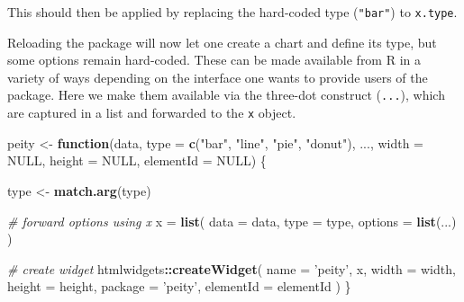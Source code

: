 \documentclass[10pt,]{krantz}
\makeatletter
\newenvironment{Shaded}{\begin{snugshade}}{\end{snugshade}}
\newcommand{\AttributeTok}[1]{\textcolor[rgb]{0.61,0.61,0.61}{#1}}
\newcommand{\CommentTok}[1]{\textcolor[rgb]{0.37,0.37,0.37}{\textit{#1}}}
\newcommand{\ControlFlowTok}[1]{\textcolor[rgb]{0.27,0.27,0.27}{\textbf{#1}}}
\newcommand{\DataTypeTok}[1]{\textcolor[rgb]{0.27,0.27,0.27}{#1}}
\newcommand{\KeywordTok}[1]{\textcolor[rgb]{0.27,0.27,0.27}{\textbf{#1}}}
\newcommand{\NormalTok}[1]{#1}
\newcommand{\OperatorTok}[1]{\textcolor[rgb]{0.43,0.43,0.43}{\textbf{#1}}}
\newcommand{\OtherTok}[1]{\textcolor[rgb]{0.37,0.37,0.37}{#1}}
\newcommand{\StringTok}[1]{\textcolor[rgb]{0.5,0.5,0.5}{#1}}
\newcommand{\VariableTok}[1]{\textcolor[rgb]{0,0,0}{#1}}
\newenvironment{kframe}{%
\medskip{}
\setlength{\fboxsep}{.8em}
 \def\at@end@of@kframe{}%
 \ifinner\ifhmode%
  \def\at@end@of@kframe{\end{minipage}}%
  \begin{minipage}{\columnwidth}%
 \fi\fi%
 \def\FrameCommand##1{\hskip\@totalleftmargin \hskip-\fboxsep
 \colorbox{shadecolor}{##1}\hskip-\fboxsep
     \hskip-\linewidth \hskip-\@totalleftmargin \hskip\columnwidth}%
 \MakeFramed {\advance\hsize-\width
   \@totalleftmargin\z@ \linewidth\hsize
   \@setminipage}}%
 {\par\unskip\endMakeFramed%
 \at@end@of@kframe}
\renewenvironment{Shaded}{\begin{kframe}}{\end{kframe}}
\makeatother
\begin{document}
This should then be applied by replacing the hard-coded type (\texttt{"bar"}) to \texttt{x.type}.

\begin{Shaded}
\end{Shaded}

Reloading the package will now let one create a chart and define its type, but some options remain hard-coded. These can be made available from R in a variety of ways depending on the interface one wants to provide users of the package. Here we make them available via the three-dot construct (\texttt{...}), which are captured in a list and forwarded to the \texttt{x} object.

\begin{Shaded}
\begin{Highlighting}[]
\NormalTok{peity <-}\StringTok{ }\ControlFlowTok{function}\NormalTok{(data, }\DataTypeTok{type =} \KeywordTok{c}\NormalTok{(}\StringTok{"bar"}\NormalTok{, }\StringTok{"line"}\NormalTok{, }\StringTok{"pie"}\NormalTok{, }\StringTok{"donut"}\NormalTok{), }
\NormalTok{  ..., }\DataTypeTok{width =} \OtherTok{NULL}\NormalTok{, }\DataTypeTok{height =} \OtherTok{NULL}\NormalTok{, }\DataTypeTok{elementId =} \OtherTok{NULL}\NormalTok{) \{}

\NormalTok{  type <-}\StringTok{ }\KeywordTok{match.arg}\NormalTok{(type)}

  \CommentTok{# forward options using x}
\NormalTok{  x =}\StringTok{ }\KeywordTok{list}\NormalTok{(}
    \DataTypeTok{data =}\NormalTok{ data,}
    \DataTypeTok{type =}\NormalTok{ type,}
    \DataTypeTok{options =} \KeywordTok{list}\NormalTok{(...)}
\NormalTok{  )}

  \CommentTok{# create widget}
\NormalTok{  htmlwidgets}\OperatorTok{::}\KeywordTok{createWidget}\NormalTok{(}
    \DataTypeTok{name =} \StringTok{'peity'}\NormalTok{,}
\NormalTok{    x,}
    \DataTypeTok{width =}\NormalTok{ width,}
    \DataTypeTok{height =}\NormalTok{ height,}
    \DataTypeTok{package =} \StringTok{'peity'}\NormalTok{,}
    \DataTypeTok{elementId =}\NormalTok{ elementId}
\NormalTok{  )}
\NormalTok{\}}
\end{Highlighting}
\end{Shaded}
\end{document}
